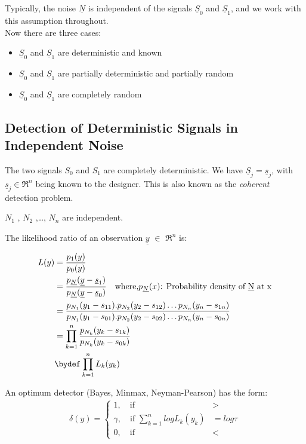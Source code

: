 \documentclass[12pt]{report}
\begin{document}
	Typically, the noise $\underline N$ is independent of the signals $\underline S_0 $ and $\underline S_1$, and we work with this assumption throughout.\\
	Now there are three cases:
	\begin{itemize}
		\item {$\underline S_0$ and $\underline S_1$ are deterministic and known}
		\item {$\underline S_0$ and $\underline S_1$ are partially deterministic and partially random}
		\item {$\underline S_0$ and $\underline S_1$ are completely random}
	\end{itemize}
	
	\subsection{Detection of Deterministic Signals in Independent Noise}
	The two signals $S_0$ and $S_1$ are completely deterministic. We have $\underline S_j = \underline s_j$, with $\underline s_j \in \Re ^n$ being known to the designer. This is also known as the \textit{coherent} detection problem.\\
	\begin{assum}
	$N_1$ , $N_2$ ,\ldots , $N_n$ are independent.
	\end{assum}
	
	\noindent The likelihood ratio of an observation $\underline y$ $\in$ $\Re^n $ is:
	
	\begin{align*}
    L(y) &= \frac{p_1(y)}{p_0(y)}\\
    &= \frac{p_{\underline N}( \underline y - \underline s_1)}{p_{\underline N}( \underline y - \underline s_0)} \quad
    \text{where,}p_{\underline N}(x)  \text{: Probability density of \underline N at x}\\
    &= \frac{p_{N_1}(y_1 - s_{11}).p_{N_2}(y_2 - s_{12}) \ldots p_{N_n}(y_n - s_{1n})}{p_{N_1}(y_1 - s_{01}).p_{N_2}(y_2 - s_{02}) \ldots p_{N_n}(y_n - s_{0n})}\\
    &= \prod_{k=1}^{n} \frac{p_{N_k}(y_k-s_{1k})}{p_{N_k}(y_k-s_{0k})}\\
    &\bydef \prod_{k=1}^{n} L_k(y_k)
\end{align*}

	\noindent An optimum detector (Bayes, Minmax, Neyman-Pearson) has the form:\\
	\begin{align*}
	\delta(y)=
	\begin{cases}
	1, \quad \text{if } & > \\
	\gamma, \quad \text{if } \sum_{k=1}^{n}log L_k(y_k) &= log \tau \\
	0, \quad \text{if } & < 
	\end{cases}
	\end{align*}
	
\end{document}
